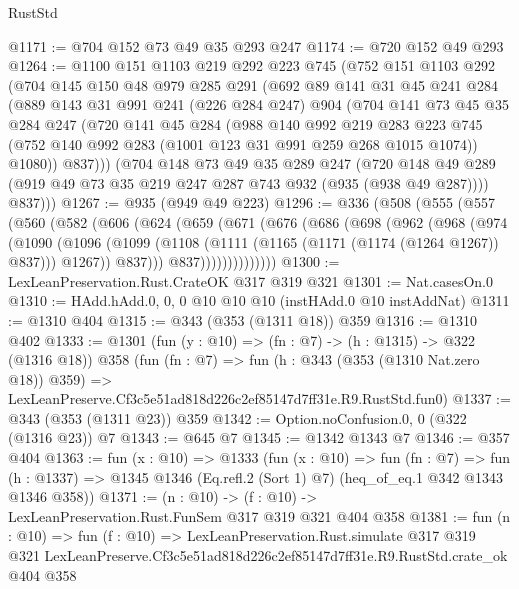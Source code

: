 \begin{lexlean}{RustStd}
\begin{coremodule}
@1171 := @704 @152 @73 @49 @35 @293 @247
@1174 := @720 @152 @49 @293
@1264 := @1100
    @151
    @1103
    @219
    @292
    @223
    @745
    (@752
      @151
      @1103
      @292
      (@704
        @145
        @150
        @48
        @979
        @285
        @291
        (@692
          @89
          @141
          @31
          @45
          @241
          @284
          (@889
            @143
            @31
            @991
            @241
            (@226 @284 @247)
            @904
            (@704
              @141
              @73
              @45
              @35
              @284
              @247
              (@720
                @141
                @45
                @284
                (@988
                  @140
                  @992
                  @219
                  @283
                  @223
                  @745
                  (@752 @140 @992 @283 (@1001 @123 @31 @991 @259 @268 @1015 @1074))
                  @1080))
              @837)))
        (@704
          @148
          @73
          @49
          @35
          @289
          @247
          (@720 @148 @49 @289 (@919 @49 @73 @35 @219 @247 @287 @743 @932 (@935 (@938 @49 @287))))
          @837)))
@1267 := @935 (@949 @49 @223)
@1296 := @336
    (@508
      (@555
        (@557
          (@560
            (@582
              (@606
                (@624
                  (@659
                    (@671
                      (@676
                        (@686
                          (@698
                            (@962
                              (@968
                                (@974
                                  (@1090
                                    (@1096
                                      (@1099
                                        (@1108
                                          (@1111 (@1165 (@1171 (@1174 (@1264 @1267)) @837)))
                                          @1267))
                                      @837)))
                                @837))))))))))))))
@1300 := LexLeanPreservation.Rust.CrateOK @317 @319 @321
@1301 := Nat.casesOn.{0}
@1310 := HAdd.hAdd.{0, 0, 0} @10 @10 @10 (instHAdd.{0} @10 instAddNat)
@1311 := @1310 @404
@1315 := @343 (@353 (@1311 @18)) @359
@1316 := @1310 @402
@1333 := @1301
    (fun (y : @10) => (fn : @7) -> (h : @1315) -> @322 (@1316 @18))
    @358
    (fun (fn : @7) =>
    fun (h : @343 (@353 (@1310 Nat.zero @18)) @359) =>
    LexLeanPreserve.Cf3c5e51ad818d226c2ef85147d7ff31e.R9.RustStd.fun0)
@1337 := @343 (@353 (@1311 @23)) @359
@1342 := Option.noConfusion.{0, 0} (@322 (@1316 @23)) @7
@1343 := @645 @7
@1345 := @1342 @1343 @7
@1346 := @357 @404
@1363 := fun (x : @10) =>
  @1333
    (fun (x : @10) =>
    fun (fn : @7) =>
    fun (h : @1337) => @1345 @1346 (Eq.refl.{2} (Sort 1) @7) (heq_of_eq.{1} @342 @1343 @1346 @358))
@1371 := (n : @10) -> (f : @10) -> LexLeanPreservation.Rust.FunSem @317 @319 @321 @404 @358
@1381 := fun (n : @10) =>
  fun (f : @10) =>
  LexLeanPreservation.Rust.simulate
    @317
    @319
    @321
    LexLeanPreserve.Cf3c5e51ad818d226c2ef85147d7ff31e.R9.RustStd.crate_ok
    @404
    @358
\end{coremodule}
\end{lexlean}
